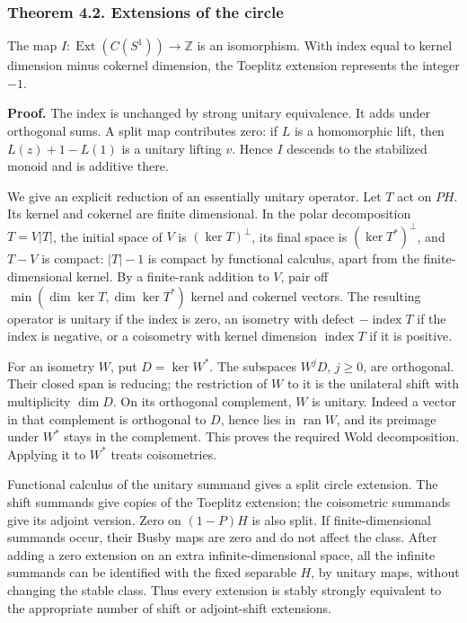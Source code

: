 \documentclass[
  11pt,
]{article}
\begin{document}
\subsubsection{Theorem 4.2. Extensions of the
circle}\label{theorem-4.2.-extensions-of-the-circle}

The map \(I:\operatorname{Ext}(C(S^1))\to\mathbb Z\) is an isomorphism.
With index equal to kernel dimension minus cokernel dimension, the
Toeplitz extension represents the integer \(-1\).

\textbf{Proof.} The index is unchanged by strong unitary equivalence. It
adds under orthogonal sums. A split map contributes zero: if \(L\) is a
homomorphic lift, then \(L(z)+1-L(1)\) is a unitary lifting \(v\). Hence
\(I\) descends to the stabilized monoid and is additive there.

We give an explicit reduction of an essentially unitary operator. Let
\(T\) act on \(PH\). Its kernel and cokernel are finite dimensional. In
the polar decomposition \(T=V|T|\), the initial space of \(V\) is
\((\ker T)^\perp\), its final space is \((\ker T^*)^\perp\), and \(T-V\)
is compact: \(|T|-1\) is compact by functional calculus, apart from the
finite-dimensional kernel. By a finite-rank addition to \(V\), pair off
\(\min(\dim\ker T,\dim\ker T^*)\) kernel and cokernel vectors. The
resulting operator is unitary if the index is zero, an isometry with
defect \(-\operatorname{index}T\) if the index is negative, or a
coisometry with kernel dimension \(\operatorname{index}T\) if it is
positive.

For an isometry \(W\), put \(D=\ker W^*\). The subspaces \(W^jD\),
\(j\geq0\), are orthogonal. Their closed span is reducing; the
restriction of \(W\) to it is the unilateral shift with multiplicity
\(\dim D\). On its orthogonal complement, \(W\) is unitary. Indeed a
vector in that complement is orthogonal to \(D\), hence lies in
\(\operatorname{ran}W\), and its preimage under \(W^*\) stays in the
complement. This proves the required Wold decomposition. Applying it to
\(W^*\) treats coisometries.

Functional calculus of the unitary summand gives a split circle
extension. The shift summands give copies of the Toeplitz extension; the
coisometric summands give its adjoint version. Zero on \((1-P)H\) is
also split. If finite-dimensional summands occur, their Busby maps are
zero and do not affect the class. After adding a zero extension on an
extra infinite-dimensional space, all the infinite summands can be
identified with the fixed separable \(H\), by unitary maps, without
changing the stable class. Thus every extension is stably strongly
equivalent to the appropriate number of shift or adjoint-shift
extensions.
\end{document}
